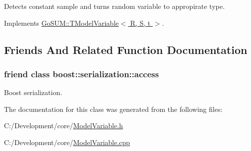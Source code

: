 Detects constant sample and turns random variable to appropirate type. 



Implements \hyperlink{class_go_s_u_m_1_1_t_model_variable_ad113f33f216796f775855dd3f8553f03}{Go\-S\-U\-M\-::\-T\-Model\-Variable$<$ R, S, t $>$}.



\subsection{Friends And Related Function Documentation}
\hypertarget{class_go_s_u_m_1_1_c_discrete_m_v_ac98d07dd8f7b70e16ccb9a01abf56b9c}{
\subsubsection[{boost\-::serialization\-::access}]{\setlength{\rightskip}{0pt plus 5cm}friend class boost\-::serialization\-::access\hspace{0.3cm}{\ttfamily [friend]}}}\label{class_go_s_u_m_1_1_c_discrete_m_v_ac98d07dd8f7b70e16ccb9a01abf56b9c}


Boost serialization. 



The documentation for this class was generated from the following files\-:\begin{DoxyCompactItemize}
\item 
C\-:/\-Development/core/\hyperlink{_model_variable_8h}{Model\-Variable.\-h}\item 
C\-:/\-Development/core/\hyperlink{_model_variable_8cpp}{Model\-Variable.\-cpp}\end{DoxyCompactItemize}
